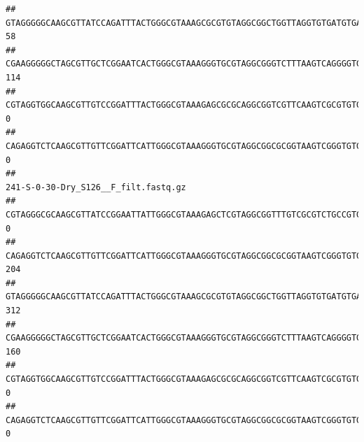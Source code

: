 \documentclass[]{article}
\begin{document}
\begin{verbatim}
## GTAGGGGGCAAGCGTTATCCAGATTTACTGGGCGTAAAGCGCGTGTAGGCGGCTGGTTAGGTGTGATGTGAAATCTTCCGGCTCAACCGGAAAACTGCATTGCAAACCGGCCTGGCTAGAGTGCAGGAGAGGGAAGCGGAATTCCAGGTGTAGCGGTGAAATGCGTAGATATCTGGAGGAACACCAGTGGCGAAGGCGGCTTCCTGGCCTGCAACTGACGCTGAGACGCGAAAGCGTGGGGAGCGAAC                                        58
## CGAAGGGGGCTAGCGTTGCTCGGAATCACTGGGCGTAAAGGGTGCGTAGGCGGGTCTTTAAGTCAGGGGTGAAATCCTGGAGCTCAACTCCAGAACTGCCTTTGATACTGAAGATCTTGAGTTCGGGAGAGGTGAGTGGAACTGCGAGTGTAGAGGTGAAATTCGTAGATATTCGCAAGAACACCAGTGGCGAAGGCGGCTCACTGGCCCGATACTGACGCTGAGGCACGAAAGCGTGGGGAGCAAACA                                      114
## CGTAGGTGGCAAGCGTTGTCCGGATTTACTGGGCGTAAAGAGCGCGCAGGCGGTCGTTCAAGTCGCGTGTGAAAGCCCCCGGCTCAACTGGGGAGGGTCACGCGATACTGATCGACTCGAAGGCAGGAGAGGGTAGTGGAATTCCCGGTGTAGTGGTGAAATGCGTAGATATCGGGAGGAACACCAGTGGCGAAGGCGACTACCTGGCCTGTTCTTGACGCTGAGGCGCGAAAGCTAGGGGAGCAAACG                                        0
## CAGAGGTCTCAAGCGTTGTTCGGATTCATTGGGCGTAAAGGGTGCGTAGGCGGCGCGGTAAGTCGGGTGTGAAATCTCGGGGCTTAACTCCGAAACTGCATTCGATACTGCCGTGCTTGAGGACTGGAGAGGAGACTGGAATTTACGGTGTAGCGGTGAAATGCGTAGATATCGTAAGGAAGACCAGTGGCGAAGGCGGGTCTCTGGACAGTTCCTGACGCTGAGGCACGAAGGCCAGGGGAGCAAACG                                        0
##                                                                                                                                                                                                                                                           241-S-0-30-Dry_S126__F_filt.fastq.gz
## CGTAGGGCGCAAGCGTTATCCGGAATTATTGGGCGTAAAGAGCTCGTAGGCGGTTTGTCGCGTCTGCCGTGAAAGTCCGGGGCTCAACTCCGGATCTGCGGTGGGTACGGGCAGACTAGAGTGATGTAGGGGAGACTGGAATTCCTGGTGTAGCGGTGAAATGCGCAGATATCAGGAGGAACACCGATGGCGAAGGCAGGTCTCTGGGCATTAACTGACGCTGAGGAGCGAAAGCATGGGGAGCGAACA                                    0
## CAGAGGTCTCAAGCGTTGTTCGGATTCATTGGGCGTAAAGGGTGCGTAGGCGGCGCGGTAAGTCGGGTGTGAAATCTCGGAGCTTAACTCCGAAACTGCATTCGATACTGCCGTGCTTGAGGACTGGAGAGGAGACTGGAATTTACGGTGTAGCGGTGAAATGCGTAGATATCGTAAGGAAGACCAGTGGCGAAGGCGGGTCTCTGGACAGTTCCTGACGCTGAGGCACGAAGGCCAGGGGAGCAAACG                                  204
## GTAGGGGGCAAGCGTTATCCAGATTTACTGGGCGTAAAGCGCGTGTAGGCGGCTGGTTAGGTGTGATGTGAAATCTTCCGGCTCAACCGGAAAACTGCATTGCAAACCGGCCTGGCTAGAGTGCAGGAGAGGGAAGCGGAATTCCAGGTGTAGCGGTGAAATGCGTAGATATCTGGAGGAACACCAGTGGCGAAGGCGGCTTCCTGGCCTGCAACTGACGCTGAGACGCGAAAGCGTGGGGAGCGAAC                                   312
## CGAAGGGGGCTAGCGTTGCTCGGAATCACTGGGCGTAAAGGGTGCGTAGGCGGGTCTTTAAGTCAGGGGTGAAATCCTGGAGCTCAACTCCAGAACTGCCTTTGATACTGAAGATCTTGAGTTCGGGAGAGGTGAGTGGAACTGCGAGTGTAGAGGTGAAATTCGTAGATATTCGCAAGAACACCAGTGGCGAAGGCGGCTCACTGGCCCGATACTGACGCTGAGGCACGAAAGCGTGGGGAGCAAACA                                  160
## CGTAGGTGGCAAGCGTTGTCCGGATTTACTGGGCGTAAAGAGCGCGCAGGCGGTCGTTCAAGTCGCGTGTGAAAGCCCCCGGCTCAACTGGGGAGGGTCACGCGATACTGATCGACTCGAAGGCAGGAGAGGGTAGTGGAATTCCCGGTGTAGTGGTGAAATGCGTAGATATCGGGAGGAACACCAGTGGCGAAGGCGACTACCTGGCCTGTTCTTGACGCTGAGGCGCGAAAGCTAGGGGAGCAAACG                                    0
## CAGAGGTCTCAAGCGTTGTTCGGATTCATTGGGCGTAAAGGGTGCGTAGGCGGCGCGGTAAGTCGGGTGTGAAATCTCGGGGCTTAACTCCGAAACTGCATTCGATACTGCCGTGCTTGAGGACTGGAGAGGAGACTGGAATTTACGGTGTAGCGGTGAAATGCGTAGATATCGTAAGGAAGACCAGTGGCGAAGGCGGGTCTCTGGACAGTTCCTGACGCTGAGGCACGAAGGCCAGGGGAGCAAACG                                    0
\end{verbatim}
\end{document}
